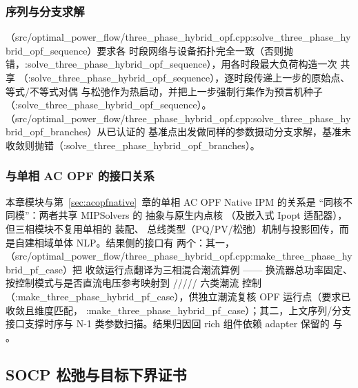 \subsubsection*{序列与分支求解}
（src/optimal\_power\_flow/three\_phase\_hybrid\_opf.cpp:solve\_three\_phase\_hybrid\_opf\_sequence）要求各
时段网络与设备拓扑完全一致（否则抛错，:solve\_three\_phase\_hybrid\_opf\_sequence），用各时段最大负荷构造一次
共享 （:solve\_three\_phase\_hybrid\_opf\_sequence），逐时段传递上一步的原始点、等式/不等式对偶
与松弛作为热启动，并把上一步强制行集作为预言机种子（:solve\_three\_phase\_hybrid\_opf\_sequence）。
（src/optimal\_power\_flow/three\_phase\_hybrid\_opf.cpp:solve\_three\_phase\_hybrid\_opf\_branches）从已认证的
基准点出发做同样的参数摄动分支求解，基准未收敛则抛错（:solve\_three\_phase\_hybrid\_opf\_branches）。

\subsubsection*{与单相 AC OPF 的接口关系}
本章模块与第~\ref{sec:acopfnative}~章的单相 AC OPF Native IPM 的关系是
“同核不同模”：两者共享 MIPSolvers 的  抽象与原生内点核
（及嵌入式 Ipopt 适配器），但三相模块不复用单相的  装配、
总线类型（PQ/PV/松弛）机制与投影回传，而是自建相域单体 NLP。结果侧的接口有
两个：其一，（src/optimal\_power\_flow/three\_phase\_hybrid\_opf.cpp:make\_three\_phase\_hybrid\_pf\_case）把
收敛运行点翻译为三相混合潮流算例 ——
换流器总功率固定、按控制模式与是否直流电压参考映射到
\allowbreak /\allowbreak /\allowbreak /\allowbreak /\allowbreak / 六类潮流
控制（:make\_three\_phase\_hybrid\_pf\_case），供独立潮流复核 OPF 运行点（要求已收敛且维度匹配，
:make\_three\_phase\_hybrid\_pf\_case）；其二，上文序列/分支接口支撑时序与 N-1 类参数扫描。结果归因回
rich 组件依赖 adapter 保留的  与
。

\subsection{SOCP 松弛与目标下界证书}\label{subsec:tp-relax}

